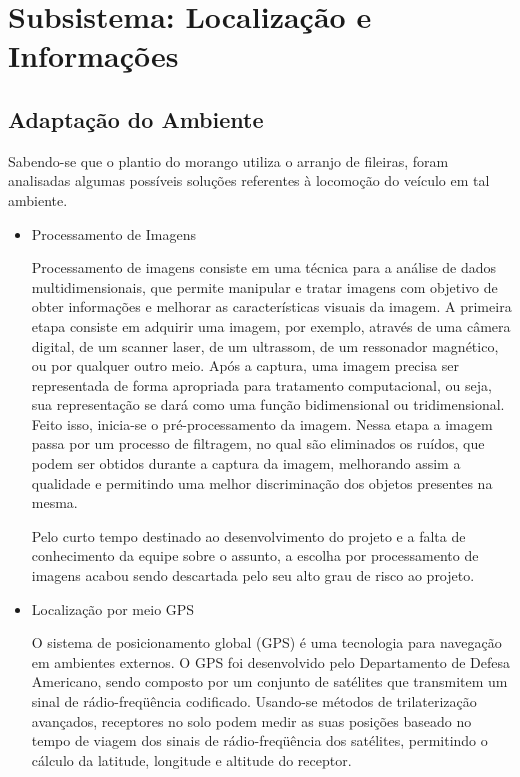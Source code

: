 \section{Subsistema: Localização e Informações}

  \subsection{Adaptação do Ambiente}

  Sabendo-se que o plantio do morango utiliza o arranjo de fileiras,
  foram analisadas algumas possíveis soluções referentes à locomoção do veículo em tal ambiente.

 \begin{itemize}

 \item Processamento de Imagens

 Processamento de imagens consiste em uma técnica para a análise de dados
multidimensionais, que permite manipular e tratar imagens com objetivo de
obter informações e melhorar as características visuais da imagem.
A primeira etapa consiste em adquirir uma imagem, por exemplo,
através de uma câmera digital, de um scanner laser, de um ultrassom,
de um ressonador magnético, ou por qualquer outro meio. Após a captura,
 uma imagem precisa ser representada de forma apropriada para tratamento
 computacional, ou seja, sua representação se dará como uma função
 bidimensional ou tridimensional. Feito isso, inicia-se o pré-processamento
  da imagem. Nessa etapa a imagem passa por um processo de filtragem,
  no qual são eliminados os ruídos, que podem ser obtidos durante a
  captura da imagem, melhorando assim a qualidade e permitindo uma melhor
  discriminação dos objetos presentes na mesma.

 Pelo curto tempo destinado ao desenvolvimento do projeto e a falta de
 conhecimento da equipe sobre o assunto, a escolha por processamento de
  imagens acabou sendo descartada pelo seu alto grau de risco ao projeto.

 \item Localização por meio GPS

 O sistema de posicionamento global (GPS) é uma tecnologia
 para navegação em ambientes externos. O GPS foi desenvolvido
 pelo Departamento de Defesa Americano, sendo composto por um conjunto
 de satélites que transmitem um sinal de rádio-freqüência codificado.
 Usando-se métodos de trilaterização avançados, receptores no solo podem
  medir as suas posições baseado no tempo de viagem dos sinais de
  rádio-freqüência dos satélites, permitindo o cálculo da latitude,
  longitude e altitude do receptor.


\end{itemize}
